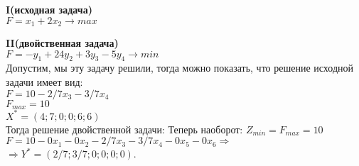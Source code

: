 \textbf{I(исходная задача)}\\
$F=x_1+2x_2 \rightarrow max$\\

\textbf{II(двойственная задача)}\\
$F=-y_1+24y_2+3y_3-5y_4 \rightarrow min$\\
Допустим, мы эту задачу решили, тогда можно показать, что решение исходной задачи имеет вид:\\
$F=10-2/7x_3-3/7x_4$\\
$F_{max}=10$\\
$X^*=(4;7;0;0;6;6)$\\
Тогда решение двойственной задачи:
Теперь наоборот:
$Z_{min}=F_{max}=10$\\
$F=10-0x_1-0x_2-2/7x_3-3/7x_4-0x_5-0x_6 \Rightarrow$\\
$\Rightarrow Y^*=(2/7;3/7;0;0;0;0)$.
